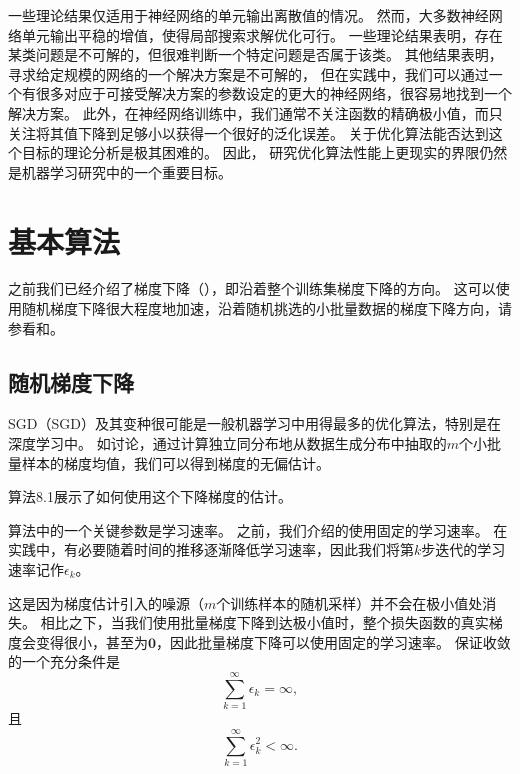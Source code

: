 一些理论结果仅适用于神经网络的单元输出离散值的情况。
然而，大多数神经网络单元输出平稳的增值，使得局部搜索求解优化可行。
一些理论结果表明，存在某类问题是不可解的，但很难判断一个特定问题是否属于该类。
其他结果表明，寻求给定规模的网络的一个解决方案是不可解的，
但在实践中，我们可以通过一个有很多对应于可接受解决方案的参数设定的更大的神经网络，很容易地找到一个解决方案。
此外，在神经网络训练中，我们通常不关注函数的精确极小值，而只关注将其值下降到足够小以获得一个很好的泛化误差。
关于优化算法能否达到这个目标的理论分析是极其困难的。
因此， 研究优化算法性能上更现实的界限仍然是机器学习研究中的一个重要目标。


\section{基本算法}
\label{sec:basic_algorithms}
之前我们已经介绍了梯度下降（），即沿着整个训练集梯度下降的方向。
这可以使用随机梯度下降很大程度地加速，沿着随机挑选的小批量数据的梯度下降方向，请参看和。

\subsection{随机梯度下降}
\label{sec:stochastic_gradient_descent_chap8}
\gls{SGD}（SGD）及其变种很可能是一般机器学习中用得最多的优化算法，特别是在深度学习中。
如讨论，通过计算独立同分布地从数据生成分布中抽取的$m$个小批量样本的梯度均值，我们可以得到梯度的无偏估计。

算法8.1展示了如何使用这个下降梯度的估计。

算法中的一个关键参数是学习速率。
之前，我们介绍的使用固定的学习速率。
在实践中，有必要随着时间的推移逐渐降低学习速率，因此我们将第$k$步迭代的学习速率记作$\epsilon_k$。

这是因为梯度估计引入的噪源（$m$个训练样本的随机采样）并不会在极小值处消失。
相比之下，当我们使用批量梯度下降到达极小值时，整个损失函数的真实梯度会变得很小，甚至为$\mathbf{0}$，因此批量梯度下降可以使用固定的学习速率。
保证收敛的一个充分条件是
\begin{equation}
\label{eq:8.12}
    \sum_{k=1}^\infty \epsilon_k = \infty,
\end{equation}
且
\begin{equation}
\label{eq:8.13}
    \sum_{k=1}^\infty \epsilon_k^2 < \infty.
\end{equation}

